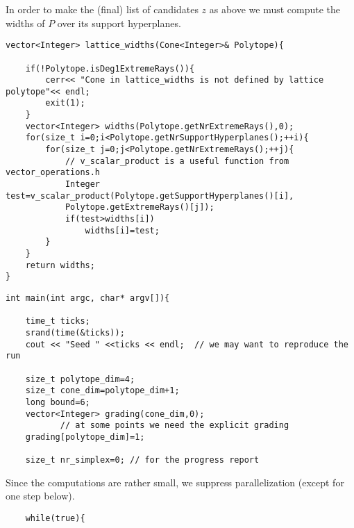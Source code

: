 \begin{small}
In order to make the (final) list of candidates $z$ as above we must compute the widths of $P$ over its support hyperplanes.
\begin{Verbatim}
vector<Integer> lattice_widths(Cone<Integer>& Polytope){

    if(!Polytope.isDeg1ExtremeRays()){
        cerr<< "Cone in lattice_widths is not defined by lattice polytope"<< endl;
        exit(1);
    }
    vector<Integer> widths(Polytope.getNrExtremeRays(),0);
    for(size_t i=0;i<Polytope.getNrSupportHyperplanes();++i){
        for(size_t j=0;j<Polytope.getNrExtremeRays();++j){
            // v_scalar_product is a useful function from vector_operations.h
            Integer test=v_scalar_product(Polytope.getSupportHyperplanes()[i],
            Polytope.getExtremeRays()[j]);
            if(test>widths[i])
                widths[i]=test;
        }
    }
    return widths;
}
\end{Verbatim}

\begin{Verbatim}
int main(int argc, char* argv[]){

    time_t ticks;
    srand(time(&ticks));
    cout << "Seed " <<ticks << endl;  // we may want to reproduce the run

    size_t polytope_dim=4;
    size_t cone_dim=polytope_dim+1;
    long bound=6;
    vector<Integer> grading(cone_dim,0); 
           // at some points we need the explicit grading
    grading[polytope_dim]=1;

    size_t nr_simplex=0; // for the progress report
\end{Verbatim}
Since the computations are rather small, we suppress parallelization (except for one step below).
\begin{Verbatim}
    while(true){


\end{Verbatim}
\end{small}
